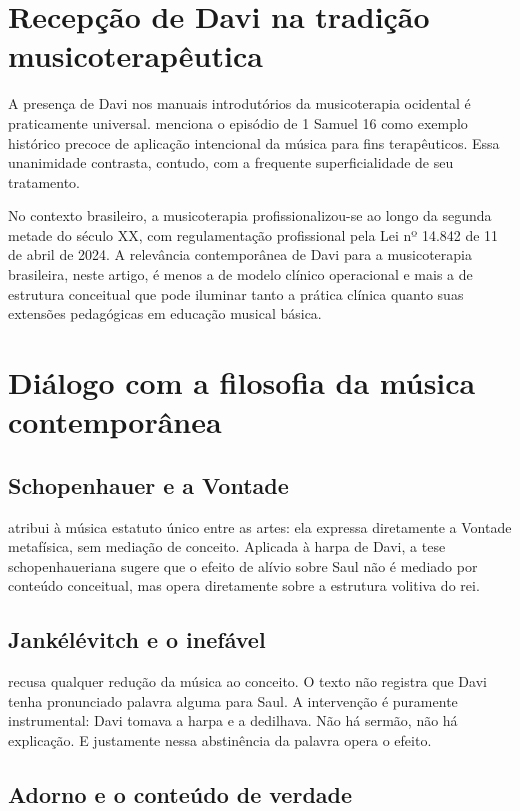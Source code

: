 \documentclass[12pt,a4paper]{article}
\begin{document}
\section{Recepção de Davi na tradição musicoterapêutica}

A presença de Davi nos manuais introdutórios da musicoterapia ocidental é praticamente universal. \citet{Bruscia2000} menciona o episódio de 1 Samuel 16 como exemplo histórico precoce de aplicação intencional da música para fins terapêuticos. Essa unanimidade contrasta, contudo, com a frequente superficialidade de seu tratamento.

No contexto brasileiro, a musicoterapia profissionalizou-se ao longo da segunda metade do século XX, com regulamentação profissional pela Lei nº 14.842 de 11 de abril de 2024. A relevância contemporânea de Davi para a musicoterapia brasileira, neste artigo, é menos a de modelo clínico operacional e mais a de estrutura conceitual que pode iluminar tanto a prática clínica quanto suas extensões pedagógicas em educação musical básica.

\section{Diálogo com a filosofia da música contemporânea}

\subsection{Schopenhauer e a Vontade}

\citet{Schopenhauer2005} atribui à música estatuto único entre as artes: ela expressa diretamente a Vontade metafísica, sem mediação de conceito. Aplicada à harpa de Davi, a tese schopenhaueriana sugere que o efeito de alívio sobre Saul não é mediado por conteúdo conceitual, mas opera diretamente sobre a estrutura volitiva do rei.

\subsection{Jankélévitch e o inefável}

\citet{Jankelevitch1983} recusa qualquer redução da música ao conceito. O texto não registra que Davi tenha pronunciado palavra alguma para Saul. A intervenção é puramente instrumental: Davi tomava a harpa e a dedilhava. Não há sermão, não há explicação. E justamente nessa abstinência da palavra opera o efeito.

\subsection{Adorno e o conteúdo de verdade}
\end{document}
